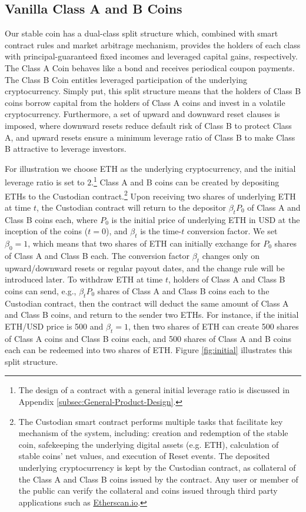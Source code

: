 \documentclass[draft, noinfoline]{ectaart}
\numberwithin{equation}{section}
\theoremstyle{plain}
\begin{document}
\subsection{Vanilla Class A and B Coins}\label{subsect:vanilla}

Our stable coin has a dual-class split structure which, combined with smart contract rules and market arbitrage mechanism, provides the holders of each class with principal-guaranteed fixed incomes and leveraged capital gains, respectively. The Class A Coin behaves like a bond and receives periodical coupon payments. The Class B Coin entitles leveraged participation of the underlying cryptocurrency. Simply put, this split structure means that the holders of Class B coins borrow capital from the holders of Class A coins and invest in a volatile cryptocurrency. Furthermore, a set of upward and downward reset clauses is imposed, where downward resets reduce default risk of Class B to protect Class A, and upward resets ensure a minimum leverage ratio of Class B to make Class B attractive to leverage investors.

For illustration we choose ETH as the underlying cryptocurrency, and the initial leverage ratio is set to $2$.\footnote{The design of a contract with a general initial leverage ratio is discussed in Appendix \ref{subsec:General-Product-Design}.} Class A and B coins can be created by depositing ETHs to the Custodian contract.\footnote{The Custodian smart contract performs multiple tasks that facilitate key mechanism of the system, including: creation and redemption of the stable coin, safekeeping the underlying digital assets (e.g. ETH), calculation of stable coins' net values, and execution of Reset events. The deposited underlying cryptocurrency is kept by the Custodian contract, as collateral of the Class A and Class B coins issued by the contract. Any user or member of the public can verify the collateral and coins issued through third party applications such as \href{http://etherscan.io}{Etherscan.io}.} Upon receiving two shares of underlying ETH at time $t$, the Custodian contract will return to the depositor $\beta_t P_0 $ of Class A and Class B coins each, where $P_{0}$ is the initial price of underlying ETH in USD at the inception of the coins ($t=0$), and $\beta_t$ is the time-$t$ conversion factor. We set $\beta_0=1$, which means that two shares of ETH can initially exchange for $P_0$ shares of Class A and Class B each. The conversion factor $\beta_t$ changes only on upward/downward resets or regular payout dates, and the change rule will be introduced later. To withdraw ETH at time $t$, holders of Class A and Class B coins can send, e.g., $\beta_t P_0$ shares of Class A and Class B coins each to the Custodian contract, then the contract will deduct the same amount of Class A and Class B coins, and return to the sender two ETHs.
For instance, if the initial ETH/USD price is 500 and $\beta_t=1$, then two shares of ETH can create 500 shares of Class A coins and Class B coins each, and 500 shares of Class A and B coins each can be redeemed into two shares of ETH. Figure \ref{fig:initial} illustrates this split structure.
\end{document}
